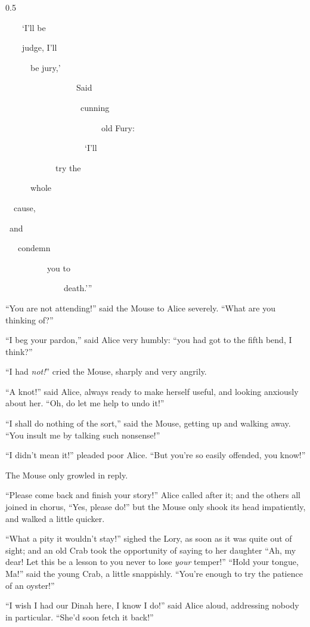 \documentclass[book, 20pt]{extbook}
\begin{document}
\begin{spacing}{0.5}
{\tiny \strut~~~~`I'll be\\
\strut~~~~judge, I'll\\
\strut~~~~~~be jury,'\\
\strut~~~~~~~~~~~~~~~~~Said\\
\strut~~~~~~~~~~~~~~~~~~cunning\\
\strut~~~~~~~~~~~~~~~~~~~~~~~old Fury:\\
\strut~~~~~~~~~~~~~~~~~~~`I'll\\
\strut~~~~~~~~~~~~try the\\
\strut~~~~~~whole\\
\strut~~cause,\\
\strut~and\\
\strut~~~condemn\\
\strut~~~~~~~~~~you to\\
\strut~~~~~~~~~~~~~~death.'{}''\\}
\end{spacing}
\bigskip
``You are not attending!'' said the Mouse to Alice severely. ``What are
you thinking of?''

``I beg your pardon,'' said Alice very humbly: ``you had got to the
fifth bend, I think?''

``I had \emph{not!}'' cried the Mouse, sharply and very angrily.

``A knot!'' said Alice, always ready to make herself useful, and looking
anxiously about her. ``Oh, do let me help to undo it!''

``I shall do nothing of the sort,'' said the Mouse, getting up and
walking away. ``You insult me by talking such nonsense!''

``I didn't mean it!'' pleaded poor Alice. ``But you're so easily
offended, you know!''

The Mouse only growled in reply.

``Please come back and finish your story!'' Alice called after it; and
the others all joined in chorus, ``Yes, please do!'' but the Mouse only
shook its head impatiently, and walked a little quicker.

``What a pity it wouldn't stay!'' sighed the Lory, as soon as it was
quite out of sight; and an old Crab took the opportunity of saying to
her daughter ``Ah, my dear! Let this be a lesson to you never to lose
\emph{your} temper!'' ``Hold your tongue, Ma!'' said the young Crab, a
little snappishly. ``You're enough to try the patience of an oyster!''

``I wish I had our Dinah here, I know I do!'' said Alice aloud,
addressing nobody in particular. ``She'd soon fetch it back!''
\end{document}
